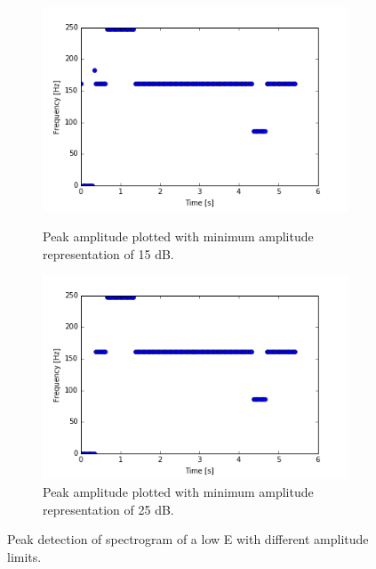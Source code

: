 \begin{figure}[H]
\begin{subfigure}{0.49\textwidth}
\end{subfigure}
\begin{subfigure}{0.49\textwidth}
\centering
\includegraphics[width=\textwidth]{figures/peak_detection/peak_lim3.png}
\caption{Peak amplitude plotted with minimum amplitude representation of 15 dB.}
\label{fig:freq_15dB_Amp_pass}

\includegraphics[width=\textwidth]{figures/peak_detection/peak_lim4.png}
\caption{Peak amplitude plotted with minimum amplitude representation of 25 dB.}
\label{fig:freq_25dB_Amp_pass}

\end{subfigure}
\caption{Peak detection of spectrogram of a low E with different amplitude limits.}
\label{fig:valdation_peak_detection}
\end{figure}

